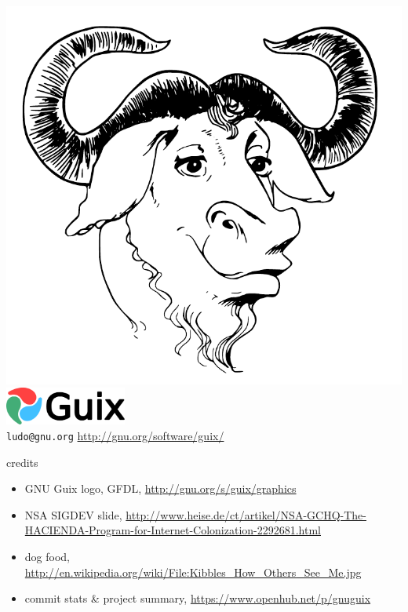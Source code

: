 \documentclass{beamer}
\begin{document}
\begin{frame}{}

  \includegraphics[height=0.7\textheight]{images/gnuhead}
\vfill{
  \hfill{\includegraphics[width=0.3\textwidth]{images/guix-logo}}\\[0.2cm]
  \texttt{ludo@gnu.org} \hfill{\alert{\url{http://gnu.org/software/guix/}}}
}

\end{frame}

\begin{frame}{credits}
  \small{
  \begin{itemize}
  \item GNU Guix logo, GFDL, \url{http://gnu.org/s/guix/graphics}
  \item NSA SIGDEV slide,
    \url{http://www.heise.de/ct/artikel/NSA-GCHQ-The-HACIENDA-Program-for-Internet-Colonization-2292681.html}
  \item dog food,
    \url{http://en.wikipedia.org/wiki/File:Kibbles_How_Others_See_Me.jpg}
  \item commit stats \& project summary,
    \url{https://www.openhub.net/p/gnuguix}
  \end{itemize}
  }
\end{frame}
\end{document}
